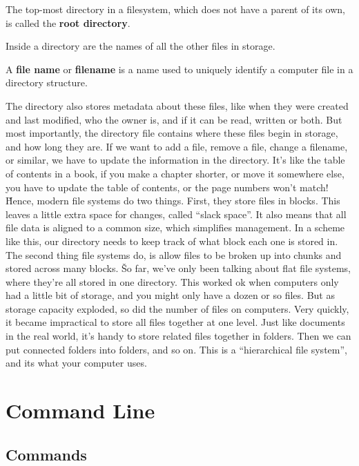 The top-most directory in a filesystem, which does not have a parent of its own, is called the \textbf{root directory}.
\ed

Inside a directory are the names of all the other files in storage.

A \textbf{file name} or \textbf{filename} is a name used to uniquely identify a computer file in a directory
structure.
\ed

The directory also stores metadata about these files, like when they were created and last modified, who the owner is,
and if it can be read, written or both. But most importantly, the directory file contains where these files begin
in storage, and how long they are. If we want to add a file, remove a file, change a filename, or similar, we have to
update the information in the directory. It's like the table of contents in a book, if you make a chapter shorter, or
move it somewhere else, you have to update the table of contents, or the page numbers won't match! \v

Hence, modern file systems do two things. First, they store files in blocks. This leaves a little extra space for
changes, called ``slack space''. It also means that all file data is aligned to a common size, which simplifies
management. In a scheme like this, our directory needs to keep track of what block each one is stored in. The second
thing file systems do, is allow files to be broken up into chunks and stored across many blocks. \v

So far, we've only been talking about flat file systems, where they're all stored in one directory. This worked ok
when computers only had a little bit of storage, and you might only have a dozen or so files. But as storage capacity
exploded, so did the number of files on computers. Very quickly, it became impractical to store all files together at
one level. Just like documents in the real world, it's handy to store related files together in folders. Then we can
put connected folders into folders, and so on. This is a ``hierarchical file system'', and its what your computer uses.

\section{Command Line}

\subsection{Commands}

